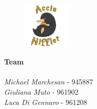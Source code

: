 \begin{titlepage}


\begin{figure}
	\centering
	\includegraphics[max width=0.2\textwidth]{../Pictures/Niffler_logo.png}
\end{figure}

\textbf{Team} \\ \\
\textit{Michael Marchesan} - 945887 \\
\textit{Giuliana Muto} - 961902 \\
\textit{Luca Di Gennaro} - 961208

\end{titlepage}

